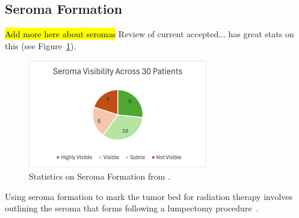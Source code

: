 \subsection{Seroma Formation\label{sec:literatureReview:seromaFormation}}
\hl{Add more here about seromas}
Review of current accepted...\cite{RefWorks:RefID:25-acree2022review} has great stats on this (see Figure~\ref{fig:literatureReview:seromaFormationStats}).
\begin{figure}[h]
        \centering
        \includegraphics[width=0.7\textwidth]{../figs/literature_review/seroma_visibility_study_results.png}
        \caption{Statistics on Seroma Formation from \cite{RefWorks:RefID:25-acree2022review}.}
        \label{fig:literatureReview:seromaFormationStats}
\end{figure}

Using seroma formation to mark the tumor bed for radiation therapy involves outlining the seroma that forms following a lumpectomy procedure~\cite{RefWorks:RefID:25-acree2022review}.

